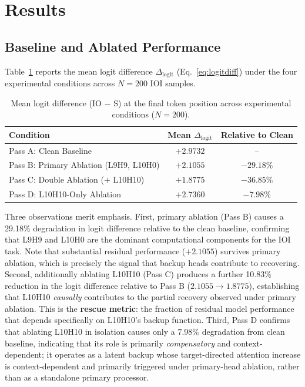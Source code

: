 \documentclass[10pt]{article} %
\begin{document}
\section{Results}
\label{sec:results}

\subsection{Baseline and Ablated Performance}
\label{subsec:baselines}

Table~\ref{tab:logit_diffs} reports the mean logit difference
$\Delta_\text{logit}$ (Eq.~\ref{eq:logitdiff}) under the four experimental
conditions across $N=200$ IOI samples.

\begin{table}[t]
  \centering
  \caption{Mean logit difference (IO $-$ S) at the final token position across experimental conditions ($N=200$).}
  \label{tab:logit_diffs}
  {\small
  \begin{tabular}{lcc}
    \toprule
    \textbf{Condition} & \textbf{Mean $\Delta_\text{logit}$} & \textbf{Relative to Clean} \\
    \midrule
    Pass A: Clean Baseline                  & $+2.9732$ & --            \\
    Pass B: Primary Ablation (L9H9, L10H0)  & $+2.1055$ & $-29.18\%$   \\
    Pass C: Double Ablation ($+$ L10H10)    & $+1.8775$ & $-36.85\%$   \\
    Pass D: L10H10-Only Ablation            & $+2.7360$ & $-7.98\%$    \\
    \bottomrule
  \end{tabular}
  }
\end{table}

Three observations merit emphasis. First, primary ablation (Pass B) causes a
29.18\% degradation in logit difference relative to the clean baseline, confirming
that L9H9 and L10H0 are the dominant computational components for the IOI task.
Note that substantial residual performance ($+2.1055$) survives primary ablation,
which is precisely the signal that backup heads contribute to recovering.
Second, additionally ablating L10H10 (Pass C) produces a further 10.83\% reduction
in the logit difference relative to Pass B ($2.1055 \to 1.8775$), establishing
that L10H10 \emph{causally} contributes to the partial recovery observed under
primary ablation. This is the \textbf{rescue metric}: the fraction of residual
model performance that depends specifically on L10H10's backup function. Third,
Pass D confirms that ablating L10H10 in isolation causes only a 7.98\% degradation
from clean baseline, indicating that its role is primarily \emph{compensatory}
and context-dependent; it operates as a latent backup whose target-directed attention
increase is context-dependent and primarily triggered under primary-head ablation,
rather than as a standalone primary processor.
\end{document}
